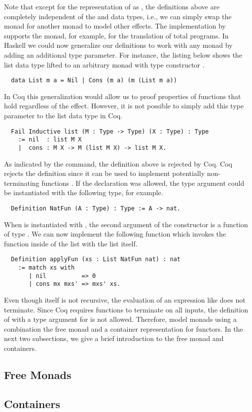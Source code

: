 Note that except for the representation of  as , the definitions above are completely independent of the  and  data types, i.e., we can simply swap the  monad for another monad to model other effects.
The implementation by \cite{Jessen:2019} supports the  monad, for example, for the translation of total programs.
In Haskell we could now generalize our definitions to work with any monad by adding an additional type parameter.
For instance, the listing below shows the list data type lifted to an arbitrary monad with type constructor .

\begin{verbatim}
  data List m a = Nil | Cons (m a) (m (List m a))
\end{verbatim}

In Coq this generalization would allow us to proof properties of functions that hold regardless of the effect.
However, it is not possible to simply add this type parameter to the list data type in Coq.

\begin{verbatim}
  Fail Inductive list (M : Type -> Type) (X : Type) : Type
    := nil  : list M X
    |  cons : M X -> M (list M X) -> list M X.
\end{verbatim}

As indicated by the  command, the definition above is rejected by Coq.
Coq rejects the definition since it can be used to implement potentially non-terminating functions \citep[p.~6]{Dylus:2018}.
If the declaration was allowed, the type argument  could be instantiated with the following type, for example.

\begin{verbatim}
  Definition NatFun (A : Type) : Type := A -> nat.
\end{verbatim}

When  is instantiated with , the second argument of the  constructor is a function of type .
We can now implement the following function which invokes the function inside of the list with the list itself.

\begin{verbatim}
  Definition applyFun (xs : List NatFun nat) : nat
    := match xs with
       | nil          => 0
       | cons mx mxs' => mxs' xs.
\end{verbatim}

Even though  itself is not recursive, the evaluation of an expression like  does not terminate.
Since Coq requires functions to terminate on all inputs, the definition of  with a type argument for  is not allowed.
Therefore, \citep{Dylus:2018} model monads using a combination the free monad and a container representation for functors.
In the next two subsections, we give a brief introduction to the free monad and containers.

\subsection{Free Monads}
\label{sec:preliminaries:modeling-effects:free}

\subsection{Containers}
\label{sec:preliminaries:modeling-effects:free}
